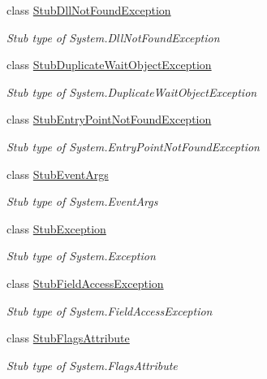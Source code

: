 \begin{DoxyCompactItemize}
class \hyperlink{class_system_1_1_fakes_1_1_stub_dll_not_found_exception}{Stub\-Dll\-Not\-Found\-Exception}
\begin{DoxyCompactList}\small\item\em Stub type of System.\-Dll\-Not\-Found\-Exception\end{DoxyCompactList}\item 
class \hyperlink{class_system_1_1_fakes_1_1_stub_duplicate_wait_object_exception}{Stub\-Duplicate\-Wait\-Object\-Exception}
\begin{DoxyCompactList}\small\item\em Stub type of System.\-Duplicate\-Wait\-Object\-Exception\end{DoxyCompactList}\item 
class \hyperlink{class_system_1_1_fakes_1_1_stub_entry_point_not_found_exception}{Stub\-Entry\-Point\-Not\-Found\-Exception}
\begin{DoxyCompactList}\small\item\em Stub type of System.\-Entry\-Point\-Not\-Found\-Exception\end{DoxyCompactList}\item 
class \hyperlink{class_system_1_1_fakes_1_1_stub_event_args}{Stub\-Event\-Args}
\begin{DoxyCompactList}\small\item\em Stub type of System.\-Event\-Args\end{DoxyCompactList}\item 
class \hyperlink{class_system_1_1_fakes_1_1_stub_exception}{Stub\-Exception}
\begin{DoxyCompactList}\small\item\em Stub type of System.\-Exception\end{DoxyCompactList}\item 
class \hyperlink{class_system_1_1_fakes_1_1_stub_field_access_exception}{Stub\-Field\-Access\-Exception}
\begin{DoxyCompactList}\small\item\em Stub type of System.\-Field\-Access\-Exception\end{DoxyCompactList}\item 
class \hyperlink{class_system_1_1_fakes_1_1_stub_flags_attribute}{Stub\-Flags\-Attribute}
\begin{DoxyCompactList}\small\item\em Stub type of System.\-Flags\-Attribute\end{DoxyCompactList}\item 

\end{DoxyCompactItemize}
